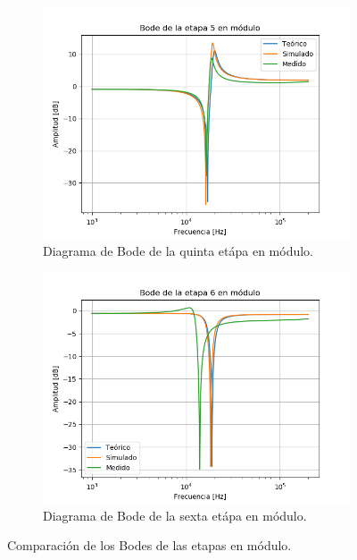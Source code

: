\begin{figure}[H]
\begin{subfigure}{.49\textwidth}
\centering
	\includegraphics[width=\textwidth]{Imagenes/Mod-5.png}
	\caption{Diagrama de Bode de la quinta etápa en módulo.}
	\label{fig:mod5}
\end{subfigure}
\centering
\begin{subfigure}{.49\textwidth}
\centering
	\includegraphics[width=\textwidth]{Imagenes/Mod-6.png}
	\caption{Diagrama de Bode de la sexta etápa en módulo.}
	\label{fig:mod6}
\end{subfigure}
\caption{Comparación de los Bodes de las etapas en módulo.}
\label{fig:bode-mag}
\end{figure}

